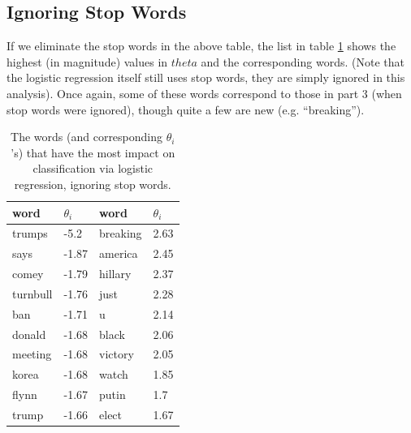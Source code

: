 \documentclass{article}
\renewcommand{\arraystretch}{1.25}
\begin{document}
   \subsection{Ignoring Stop Words}
   If we eliminate the stop words in the above table, the list in table \ref{part6table2} shows the highest (in magnitude)
   values in $theta$ and the corresponding words. (Note that the logistic regression itself still uses stop
   words, they are simply ignored in this analysis). Once again, some of these words correspond to those
   in part 3 (when stop words were ignored), though quite a few are new (e.g. ``breaking'').

   \begin{table}[h]
      \centering
      \renewcommand{\arraystretch}{1.5}

      \begin{tabular}{ p{7em}|l || p{7em}|l }
         \hline
         word     &     $\theta_i$   & word & $\theta_i$   \\
         \hline \hline
         trumps      &     -5.2        &  breaking    & 2.63    \\
         says        &     -1.87       &  america     & 2.45    \\
         comey       &     -1.79       &  hillary     & 2.37    \\
         turnbull    &     -1.76       &  just        & 2.28    \\
         ban         &     -1.71       &  u           & 2.14    \\
         donald      &     -1.68       &  black       & 2.06    \\
         meeting     &     -1.68       &  victory     & 2.05    \\
         korea       &     -1.68       &  watch       & 1.85    \\
         flynn       &     -1.67       &  putin       & 1.7     \\
         trump       &     -1.66       &  elect       & 1.67    \\
         \hline
      \end{tabular}

      \caption{ The words (and corresponding $\theta_i$'s) that have the most impact
               on classification via logistic regression, ignoring stop words.}
      \label{part6table2}
   \end{table}
\end{document}
